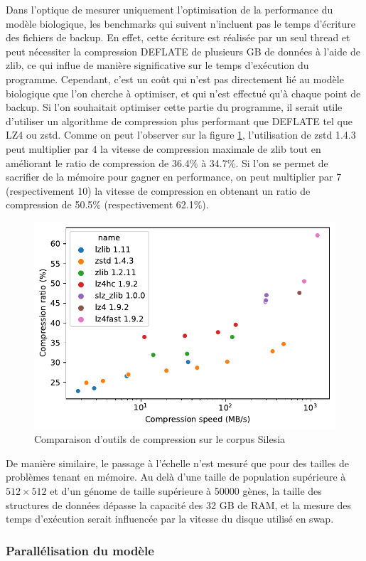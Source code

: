 \documentclass[a4paper, 10pt, twoside]{article}
\begin{document}
Dans l'optique de mesurer uniquement l'optimisation de la performance du modèle biologique, les benchmarks qui suivent n'incluent pas le temps d'écriture des fichiers de backup. En effet, cette écriture est réalisée par un seul thread et peut nécessiter la compression DEFLATE de plusieurs GB de données à l'aide de zlib, ce qui influe de manière significative sur le temps d'exécution du programme. Cependant, c'est un coût qui n'est pas directement lié au modèle biologique que l'on cherche à optimiser, et qui n'est effectué qu'à chaque point de backup. Si l'on souhaitait optimiser cette partie du programme, il serait utile d'utiliser un algorithme de compression plus performant que DEFLATE tel que LZ4 ou zstd. Comme on peut l'observer sur la figure \ref{fig:compression/tools}, l'utilisation de zstd 1.4.3 peut multiplier par 4 la vitesse de compression maximale de zlib tout en améliorant le ratio de compression de 36.4\% à 34.7\%. Si l'on se permet de sacrifier de la mémoire pour gagner en performance, on peut multiplier par 7 (respectivement 10) la vitesse de compression en obtenant un ratio de compression de 50.5\% (respectivement 62.1\%).

\begin{figure}[htbp]
	\centering
	\includegraphics[width=0.5\linewidth]{img/compression_tools.pdf}
	\caption{Comparaison d'outils de compression sur le corpus Silesia \cite{lzbench}}
	\label{fig:compression/tools}
\end{figure}

De manière similaire, le passage à l'échelle n'est mesuré que pour des tailles de problèmes tenant en mémoire. Au delà d'une taille de population supérieure à $512 \times 512$ et d'un génome de taille supérieure à 50000 gènes, la taille des structures de données dépasse la capacité des 32 GB de RAM, et la mesure des temps d'exécution serait influencée par la vitesse du disque utilisé en swap.

\subsubsection{Parallélisation du modèle}
\end{document}
